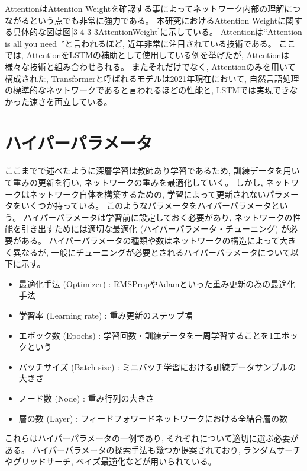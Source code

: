 AttentionはAttention Weightを確認する事によってネットワーク内部の理解につながるという点でも非常に強力である。
本研究におけるAttention Weightに関する具体的な図は図\ref{3-4-3-3AttentionWeight}に示している。
Attentionは``Attention is all you need~\cite{AttentionIsAllYouNeed}''と言われるほど, 近年非常に注目されている技術である。
ここでは, AttentionをLSTMの補助として使用している例を挙げたが, Attentionは様々な技術と組み合わせられる。
またそれだけでなく, Attentionのみを用いて構成された, Transformerと呼ばれるモデルは2021年現在において, 自然言語処理の標準的なネットワークであると言われるほどの性能と, LSTMでは実現できなかった速さを両立している。

\newpage
\section{ハイパーパラメータ} \label{DL:HyperParameter}

ここまでで述べたように深層学習は教師あり学習であるため, 訓練データを用いて重みの更新を行い, ネットワークの重みを最適化していく。
しかし, ネットワークはネットワーク自体を構築するための, 学習によって更新されないパラメータをいくつか持っている。
このようなパラメータをハイパーパラメータという。
ハイパーパラメータは学習前に設定しておく必要があり, ネットワークの性能を引き出すためには適切な最適化 (ハイパーパラメータ・チューニング) が必要がある。
ハイパーパラメータの種類や数はネットワークの構造によって大きく異なるが, 一般にチューニングが必要とされるハイパーパラメータについて以下に示す。

\begin{itemize}
  \item 最適化手法 (Optimizer) : RMSPropやAdamといった重み更新の為の最適化手法
  \item 学習率 (Learning rate) : 重み更新のステップ幅
  \item エポック数 (Epochs) : 学習回数・訓練データを一周学習することを1エポックという
  \item バッチサイズ (Batch size) : ミニバッチ学習における訓練データサンプルの大きさ
  \item ノード数 (Node) : 重み行列の大きさ
  \item 層の数 (Layer) : フィードフォワードネットワークにおける全結合層の数
\end{itemize}

これらはハイパーパラメータの一例であり, それぞれについて適切に選ぶ必要がある。
ハイパーパラメータの探索手法も幾つか提案されており, ランダムサーチやグリッドサーチ, ベイズ最適化などが用いられている。

